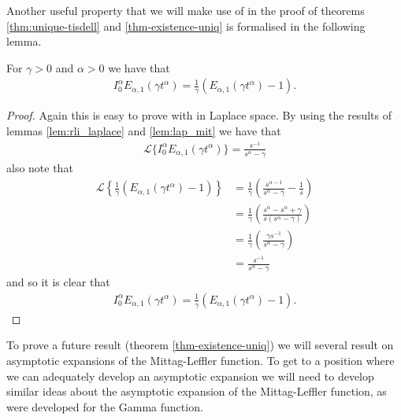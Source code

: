 Another useful property that we will make use of in the proof of theorems \ref{thm:unique-tisdell} and \ref{thm-existence-uniq} is formalised in the following lemma.
\begin{mdframed}[innertopmargin=10pt]
\begin{lemma}	
\label{lem-rli-mit-lef-2}
For $ \gamma > 0 $ and $ \alpha > 0 $ we have that
	\begin{align*}
		I_0^\alpha E_{\alpha,1}(\gamma t^\alpha) = \frac{1}{\gamma} \left( E_{\alpha,1}(\gamma t^\alpha) - 1 \right).
	\end{align*}
\end{lemma}
\end{mdframed}
\begin{proof}
	Again this is easy to prove with in Laplace space.
	By using the results of lemmas \ref{lem:rli_laplace} and \ref{lem:lap_mit} we have that
	\begin{align*}
    	\mathcal{L}\{ I_0^\alpha E_{\alpha, 1}(\gamma t^\alpha) \} = \frac{s^{-1}}{s^\alpha - \gamma}
	\end{align*}
	also note that
	\begin{align*}
	    \mathcal{L}\left\{ \frac{1}{\gamma}( E_{\alpha, 1}(\gamma t^\alpha) - 1) \right\} &= \frac{1}{\gamma} \left( \frac{s^{\alpha-1}}{s^\alpha - \gamma} - \frac{1}{s} \right) \\
	    &= \frac{1}{\gamma}\left( \frac{s^\alpha - s^\alpha + \gamma}{s(s^\alpha - \gamma)}\right) \\
	    &= \frac{1}{\gamma}\left(\frac{\gamma s^{-1}}{s^\alpha - \gamma}\right) \\
	    &= \frac{s^{-1}}{s^\alpha - \gamma}
	\end{align*}
	and so it is clear that
	\begin{align*}
I_0^\alpha E_{\alpha,1}(\gamma t^\alpha) = \frac{1}{\gamma} \left( E_{\alpha,1}(\gamma t^\alpha) - 1 \right).
	\end{align*}
\end{proof}

To prove a future result (theorem \ref{thm-existence-uniq}) we will several result on asymptotic expansions of the Mittag-Leffler function. To get to a position where we can adequately develop an asymptotic expansion we will need to develop similar ideas about the asymptotic expansion of the Mittag-Leffler function, as were developed for the Gamma function.

